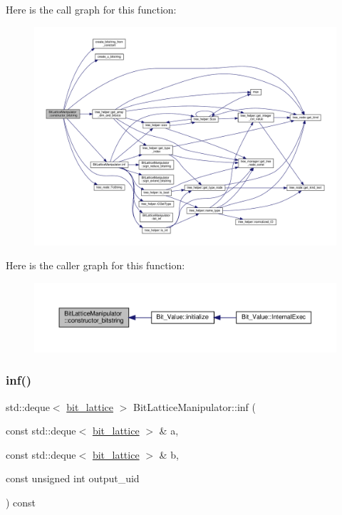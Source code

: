 Here is the call graph for this function\+:
\nopagebreak
\begin{figure}[H]
\begin{center}
\leavevmode
\includegraphics[width=350pt]{dd/d98/classBitLatticeManipulator_aa0f6e165b5ecfb6894eaa75275cbb58b_cgraph}
\end{center}
\end{figure}
Here is the caller graph for this function\+:
\nopagebreak
\begin{figure}[H]
\begin{center}
\leavevmode
\includegraphics[width=350pt]{dd/d98/classBitLatticeManipulator_aa0f6e165b5ecfb6894eaa75275cbb58b_icgraph}
\end{center}
\end{figure}
\mbox{\label{classBitLatticeManipulator_ae7c7d4aab6d19114196a9dc8cea6a32c}} 
\subsubsection{\texorpdfstring{inf()}{inf()}}
{\footnotesize\ttfamily std\+::deque$<$ \hyperlink{bit__lattice_8hpp_ab732360111c810c4eaeb4c8b81d160d6}{bit\+\_\+lattice} $>$ Bit\+Lattice\+Manipulator\+::inf (\begin{DoxyParamCaption}\item[{const std\+::deque$<$ \hyperlink{bit__lattice_8hpp_ab732360111c810c4eaeb4c8b81d160d6}{bit\+\_\+lattice} $>$ \&}]{a,  }\item[{const std\+::deque$<$ \hyperlink{bit__lattice_8hpp_ab732360111c810c4eaeb4c8b81d160d6}{bit\+\_\+lattice} $>$ \&}]{b,  }\item[{const unsigned int}]{output\+\_\+uid }\end{DoxyParamCaption}) const\hspace{0.3cm}{\ttfamily [protected]}}



